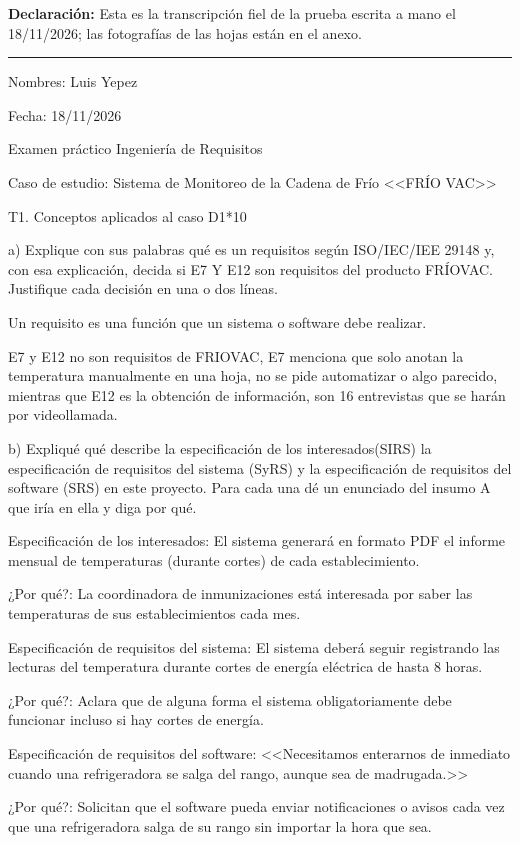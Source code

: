 \documentclass[11pt,a4paper]{article}
\begin{document}
\textbf{Declaración:} Esta es la transcripción fiel de la prueba escrita a mano el 18/11/2026; las fotografías de las hojas están en el anexo.

\bigskip
\hrule
\bigskip

Nombres: Luis Yepez

Fecha: 18/11/2026

Examen práctico Ingeniería de Requisitos

Caso de estudio: Sistema de Monitoreo de la Cadena de Frío <<FRÍO VAC>>

T1. Conceptos aplicados al caso \hfill D1*10

a) Explique con sus palabras qué es un requisitos según ISO/IEC/IEE 29148 y, con esa explicación, decida si E7 Y E12 son requisitos del producto FRÍOVAC. Justifique cada decisión en una o dos líneas.

Un requisito es una función que  un sistema o software debe realizar.

E7 y E12 no son requisitos de FRIOVAC, E7 menciona que solo anotan la temperatura manualmente en una hoja, no se pide automatizar o algo parecido, mientras que E12 es la obtención de información, son 16 entrevistas que se harán por videollamada.

b) Expliqué qué describe la especificación de los interesados(SIRS) la especificación de requisitos del sistema (SyRS) y la especificación de requisitos del software (SRS) en este proyecto. Para cada una dé un enunciado del insumo A que iría en ella y diga por qué.

Especificación de los interesados: El sistema generará en formato PDF el informe mensual de temperaturas (durante cortes) de cada establecimiento.

¿Por qué?: La coordinadora de inmunizaciones está interesada por saber las temperaturas de sus establecimientos cada mes.

\clearpage

Especificación de requisitos del sistema: El sistema deberá seguir registrando las lecturas del temperatura durante cortes de energía eléctrica de hasta 8 horas.

¿Por qué?: Aclara que de alguna forma el sistema obligatoriamente debe funcionar incluso si hay cortes de energía.

Especificación de requisitos del software: <<Necesitamos enterarnos de inmediato cuando una refrigeradora se salga del rango, aunque sea de madrugada.>>

¿Por qué?: Solicitan que el software pueda enviar notificaciones o avisos cada vez que una refrigeradora salga de su rango sin importar la hora que sea.
\end{document}
